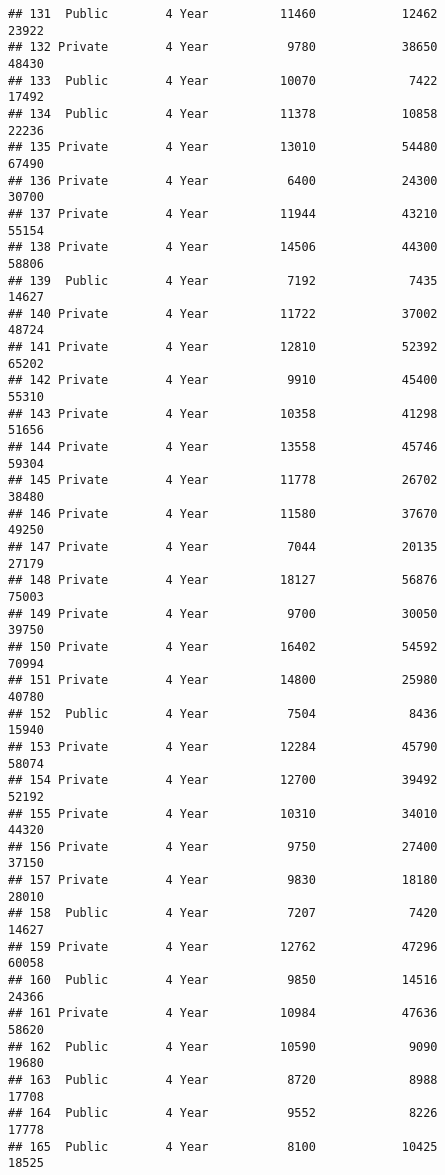 \documentclass[
]{article}
\begin{document}
\begin{verbatim}
## 131  Public        4 Year          11460            12462          23922
## 132 Private        4 Year           9780            38650          48430
## 133  Public        4 Year          10070             7422          17492
## 134  Public        4 Year          11378            10858          22236
## 135 Private        4 Year          13010            54480          67490
## 136 Private        4 Year           6400            24300          30700
## 137 Private        4 Year          11944            43210          55154
## 138 Private        4 Year          14506            44300          58806
## 139  Public        4 Year           7192             7435          14627
## 140 Private        4 Year          11722            37002          48724
## 141 Private        4 Year          12810            52392          65202
## 142 Private        4 Year           9910            45400          55310
## 143 Private        4 Year          10358            41298          51656
## 144 Private        4 Year          13558            45746          59304
## 145 Private        4 Year          11778            26702          38480
## 146 Private        4 Year          11580            37670          49250
## 147 Private        4 Year           7044            20135          27179
## 148 Private        4 Year          18127            56876          75003
## 149 Private        4 Year           9700            30050          39750
## 150 Private        4 Year          16402            54592          70994
## 151 Private        4 Year          14800            25980          40780
## 152  Public        4 Year           7504             8436          15940
## 153 Private        4 Year          12284            45790          58074
## 154 Private        4 Year          12700            39492          52192
## 155 Private        4 Year          10310            34010          44320
## 156 Private        4 Year           9750            27400          37150
## 157 Private        4 Year           9830            18180          28010
## 158  Public        4 Year           7207             7420          14627
## 159 Private        4 Year          12762            47296          60058
## 160  Public        4 Year           9850            14516          24366
## 161 Private        4 Year          10984            47636          58620
## 162  Public        4 Year          10590             9090          19680
## 163  Public        4 Year           8720             8988          17708
## 164  Public        4 Year           9552             8226          17778
## 165  Public        4 Year           8100            10425          18525

\end{verbatim}
\end{document}

